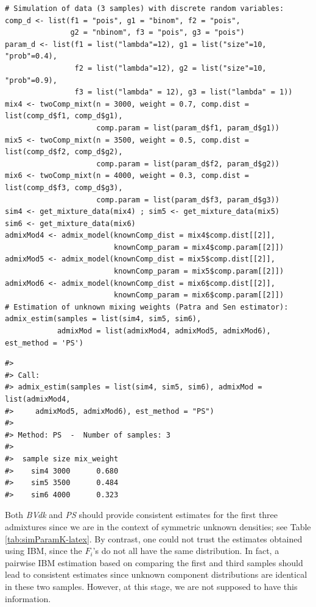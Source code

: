 \begin{verbatim}
# Simulation of data (3 samples) with discrete random variables:
comp_d <- list(f1 = "pois", g1 = "binom", f2 = "pois", 
               g2 = "nbinom", f3 = "pois", g3 = "pois")
param_d <- list(f1 = list("lambda"=12), g1 = list("size"=10, "prob"=0.4),
                f2 = list("lambda"=12), g2 = list("size"=10, "prob"=0.9),
                f3 = list("lambda" = 12), g3 = list("lambda" = 1))
mix4 <- twoComp_mixt(n = 3000, weight = 0.7, comp.dist = list(comp_d$f1, comp_d$g1),
                     comp.param = list(param_d$f1, param_d$g1))
mix5 <- twoComp_mixt(n = 3500, weight = 0.5, comp.dist = list(comp_d$f2, comp_d$g2),
                     comp.param = list(param_d$f2, param_d$g2))
mix6 <- twoComp_mixt(n = 4000, weight = 0.3, comp.dist = list(comp_d$f3, comp_d$g3),
                     comp.param = list(param_d$f3, param_d$g3))
sim4 <- get_mixture_data(mix4) ; sim5 <- get_mixture_data(mix5)
sim6 <- get_mixture_data(mix6)
admixMod4 <- admix_model(knownComp_dist = mix4$comp.dist[[2]],
                         knownComp_param = mix4$comp.param[[2]])
admixMod5 <- admix_model(knownComp_dist = mix5$comp.dist[[2]],
                         knownComp_param = mix5$comp.param[[2]])
admixMod6 <- admix_model(knownComp_dist = mix6$comp.dist[[2]],
                         knownComp_param = mix6$comp.param[[2]])
# Estimation of unknown mixing weights (Patra and Sen estimator):
admix_estim(samples = list(sim4, sim5, sim6), 
            admixMod = list(admixMod4, admixMod5, admixMod6), est_method = 'PS')
\end{verbatim}

\begin{verbatim}
#> 
#> Call:
#> admix_estim(samples = list(sim4, sim5, sim6), admixMod = list(admixMod4, 
#>     admixMod5, admixMod6), est_method = "PS")
#> 
#> Method: PS  -  Number of samples: 3 
#> 
#>  sample size mix_weight
#>    sim4 3000      0.680
#>    sim5 3500      0.484
#>    sim6 4000      0.323
\end{verbatim}

Both \emph{BVdk} and \emph{PS} should provide consistent estimates for the first three admixtures since we are in the context of symmetric unknown densities; see Table \ref{tab:simParamK-latex}. By contrast, one could not trust the estimates obtained using IBM, since the \(F_i\)'s do not all have the same distribution. In fact, a pairwise IBM estimation based on comparing the first and third samples should lead to consistent estimates since unknown component distributions are identical in these two samples. However, at this stage, we are not supposed to have this information.

